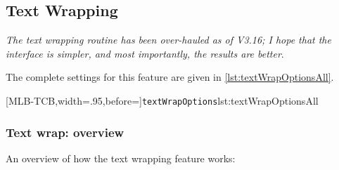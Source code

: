 \subsection{Text Wrapping}\label{subsec:textwrapping}
 \emph{The text wrapping routine has been over-hauled as
 of V3.16; I hope that the interface is simpler, and most importantly, the results are
 better}.

 The complete settings for this feature are given in \cref{lst:textWrapOptionsAll}.

 [MLB-TCB,width=.95\linewidth,before=\centering]{\texttt{textWrapOptions}}{lst:textWrapOptionsAll}

\subsubsection{Text wrap: overview}
 An overview of how the text wrapping feature works:
